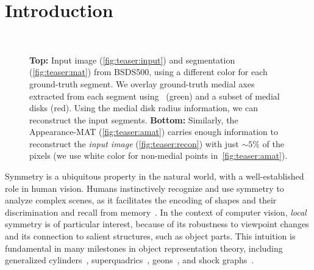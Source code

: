 \documentclass[10pt,twocolumn,letterpaper]{article}
\begin{document}
\section{Introduction}\label{sec:introduction}
\begin{figure}[!t]
\centering
{}
 \\
\caption{\textbf{Top:} Input image (\ref{fig:teaser:input}) and segmentation (\ref{fig:teaser:mat}) from BSDS500,
using a different color for each ground-truth segment. 
We overlay ground-truth medial axes extracted from each segment using~\cite{telea2002augmented} (green) and a subset of medial disks (red). 
Using the medial disk radius information, we can reconstruct the input segments. 
\textbf{Bottom:} Similarly, the Appearance-MAT (\ref{fig:teaser:amat}) carries enough information to reconstruct the 
 \emph{input image} (\ref{fig:teaser:recon}) with just $\sim 5\%$ of the pixels 
 (we use white color for non-medial points in~\ref{fig:teaser:amat}).}
\label{fig:teaser}
\end{figure}


Symmetry is a ubiquitous property in the natural world, with a well-established role in human vision.
Humans instinctively recognize and use symmetry to analyze complex scenes, as it facilitates the encoding of shapes and
their discrimination and recall from memory~\cite{barlow1979versatility,royer1981detection,wagemans1998parallel}.
In the context of computer vision, \emph{local} symmetry is of particular interest, 
because of its robustness to viewpoint changes and its connection to salient structures, such as object parts.
This intuition is fundamental in many milestones in object representation theory, including generalized
cylinders~\cite{binford1971visual}, superquadrics~\cite{barr1981superquadrics}, 
geons~\cite{biederman1987recognition}, and shock graphs~\cite{siddiqi1999shock}.
\end{document}
